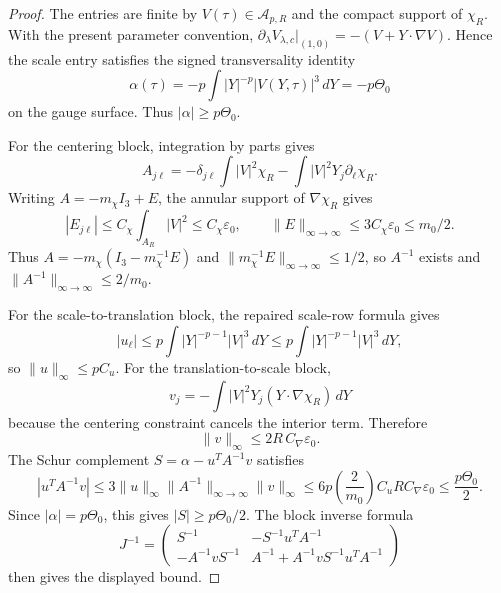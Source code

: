 \documentclass[11pt]{amsart}
\theoremstyle{plain}
\theoremstyle{definition}
\theoremstyle{remark}
\begin{document}
\begin{proof}
The entries are finite by \(V(\tau)\in\mathcal A_{p,R}\) and the compact support
of \(\chi_R\). With the present parameter convention,
\(\partial_\lambda V_{\lambda,c}|_{(1,0)}=-(V+Y\cdot\nabla V)\). Hence the
scale entry satisfies the signed transversality identity
\[
\alpha(\tau)=-p\int |Y|^{-p}|V(Y,\tau)|^3\,dY=-p\Theta_0
\]
on the gauge surface. Thus \(|\alpha|\ge p\Theta_0\).

For the centering block, integration by parts gives
\[
A_{j\ell}
=-\delta_{j\ell}\int |V|^2\chi_R
-\int |V|^2Y_j\partial_\ell\chi_R.
\]
Writing \(A=-m_\chi I_3+E\), the annular support of \(\nabla\chi_R\) gives
\[
|E_{j\ell}|\le C_\chi\int_{A_R}|V|^2\le C_\chi\varepsilon_0,\qquad
\|E\|_{\infty\to\infty}\le3C_\chi\varepsilon_0\le m_0/2.
\]
Thus \(A=-m_\chi(I_3-m_\chi^{-1}E)\) and
\(\|m_\chi^{-1}E\|_{\infty\to\infty}\le1/2\), so \(A^{-1}\) exists and
\(\|A^{-1}\|_{\infty\to\infty}\le2/m_0\).

For the scale-to-translation block, the repaired scale-row formula gives
\[
\left|u_\ell\right|
\le p\int |Y|^{-p-1}|V|^3\,dY
\le p\int |Y|^{-p-1}|V|^3\,dY,
\]
so \(\|u\|_\infty\le pC_u\). For the translation-to-scale block,
\[
v_j=-\int |V|^2Y_j(Y\cdot\nabla\chi_R)\,dY
\]
because the centering constraint cancels the interior term. Therefore
\[
\|v\|_\infty\le2R\,C_\nabla\varepsilon_0.
\]
The Schur complement \(S=\alpha-u^TA^{-1}v\) satisfies
\[
|u^TA^{-1}v|
\le 3\|u\|_\infty\|A^{-1}\|_{\infty\to\infty}\|v\|_\infty
\le 6p\left(\frac{2}{m_0}\right)C_uRC_\nabla\varepsilon_0
\le \frac{p\Theta_0}{2}.
\]
Since \(|\alpha|=p\Theta_0\), this gives \(|S|\ge p\Theta_0/2\).
The block inverse formula
\[
J^{-1}=
\begin{pmatrix}
S^{-1} & -S^{-1}u^TA^{-1}\\
-A^{-1}vS^{-1}&A^{-1}+A^{-1}vS^{-1}u^TA^{-1}
\end{pmatrix}
\]
then gives the displayed bound.
\end{proof}
\end{document}
